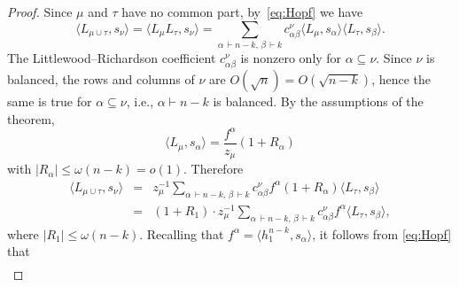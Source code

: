 \documentclass[12pt]%
{amsart}
\newcommand{\al}{{\alpha}}
\newcommand{\om}{{\omega}}
\theoremstyle{plain}
\theoremstyle{definition}
\theoremstyle{remark}
\begin{document}
\begin{proof}
Since $\mu$ and $\tau$ have no common part, 
by~\eqref{eq:Hopf} we have
\[
    \langle L_{\mu\cup\tau},s_\nu \rangle
    = \langle L_\mu L_\tau,s_\nu \rangle
    = \sum_{\al \,\vdash n-k,\,\beta \,\vdash k} c^\nu_{\al\beta} \langle L_\mu,s_\al \rangle \langle L_\tau,s_{\beta} \rangle.
\]
The Littlewood--Richardson coefficient $c^\nu_{\al\beta}$ is nonzero only for $\al \subseteq \nu$. Since $\nu$ is balanced, the rows and columns of $\nu$ are $O(\sqrt{n})=O(\sqrt{n-k})$, hence the same is true for $\al \subseteq \nu$, i.e., $\al\vdash n-k$ is balanced.  
By the assumptions of the theorem,
\[
    \langle L_\mu,s_\al \rangle
    = \frac{f^\al}{z_\mu} (1+R_\al)
\]
with $|R_\al| \le \om(n-k) = o(1)$. 
Therefore
\begin{eqnarray*}%
    \langle L_{\mu\cup\tau},s_\nu \rangle
    &=& z_\mu^{-1} \sum_{\al \,\vdash n-k,\,\beta \,\vdash k} c^\nu_{\al\beta} f^\al (1+R_\al) \langle L_\tau,s_{\beta} \rangle \nonumber \\
    &=& (1 + R_1) \cdot z_\mu^{-1} \sum_{\al \,\vdash n-k,\,\beta \,\vdash k} c^\nu_{\al\beta} f^\al \langle L_\tau,s_{\beta} \rangle,
\end{eqnarray*} 
where $|R_1| \le \om(n-k)$. 
Recalling that $f^\al=\langle h_1^{n-k},s_\al\rangle$, it follows from 
\eqref{eq:Hopf} that
\begin{eqnarray*}

\end{eqnarray*}
\end{proof}
\end{document}
